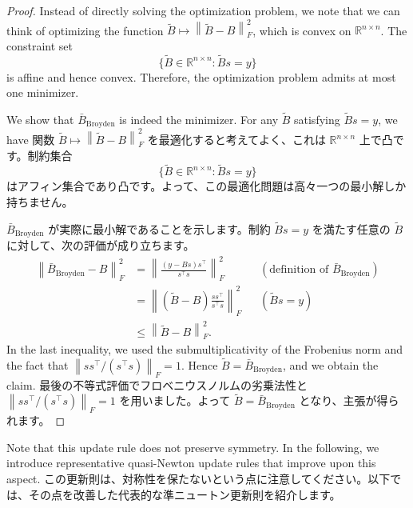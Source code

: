 \documentclass[0_main]{subfiles}
\begin{document}
\begin{proof}
    \ifEn
        Instead of directly solving the optimization problem, we note that we can think of optimizing the function $\tilde{B} \mapsto \left\lVert \tilde{B} - B \right\rVert_F^2$, which is convex on $\mathbb{R}^{n \times n}$. The constraint set
        \begin{equation*}
            \{\tilde{B}\in\mathbb{R}^{n\times n}:\tilde{B}s=y\}
        \end{equation*}
        is affine and hence convex. Therefore, the optimization problem admits at most one minimizer.

        We show that $\bar{B}_{\mathrm{Broyden}}$ is indeed the minimizer. For any $\tilde{B}$ satisfying $\tilde{B}s=y$, we have
    \else
        関数 $\tilde{B}\mapsto\left\lVert \tilde{B}-B \right\rVert^2_F$ を最適化すると考えてよく、これは $\mathbb{R}^{n\times n}$ 上で凸です。制約集合
        \begin{equation*}
            \{\tilde{B}\in\mathbb{R}^{n\times n}:\tilde{B}s=y\}
        \end{equation*}
        はアフィン集合であり凸です。よって、この最適化問題は高々一つの最小解しか持ちません。

        $\bar{B}_{\mathrm{Broyden}}$ が実際に最小解であることを示します。制約 $\tilde{B}s=y$ を満たす任意の $\tilde{B}$ に対して、次の評価が成り立ちます。
    \fi
    \begin{align*}
        \left\lVert \bar{B}_{\mathrm{Broyden}} - B \right\rVert_F^2
         & = \left\lVert \frac{(y - Bs)s^\top}{s^\top s} \right\rVert_F^2         &  & (\text{definition of $\bar{B}_{\mathrm{Broyden}}$}) \\
         & = \left\lVert (\tilde{B}-B) \frac{s s^\top}{s^\top s} \right\rVert_F^2 &  & (\tilde{B}s=y)                                      \\
         & \leq \left\lVert \tilde{B}-B \right\rVert_F^2.
    \end{align*}
    \ifEn
        In the last inequality, we used the submultiplicativity of the Frobenius norm and the fact that $\left\lVert ss^\top/(s^\top s) \right\rVert_F=1$. Hence $\tilde{B}=\bar{B}_{\mathrm{Broyden}}$, and we obtain the claim.
    \else
        最後の不等式評価でフロベニウスノルムの劣乗法性と $\left\lVert ss^\top/(s^\top s) \right\rVert_F=1$ を用いました。よって $\tilde{B}=\bar{B}_{\mathrm{Broyden}}$ となり、主張が得られます。
    \fi
    \myQED
\end{proof}

\ifEn
    Note that this update rule does not preserve symmetry. In the following, we introduce representative quasi-Newton update rules that improve upon this aspect.
\else
    この更新則は、対称性を保たないという点に注意してください。以下では、その点を改善した代表的な準ニュートン更新則を紹介します。
\fi
\end{document}
